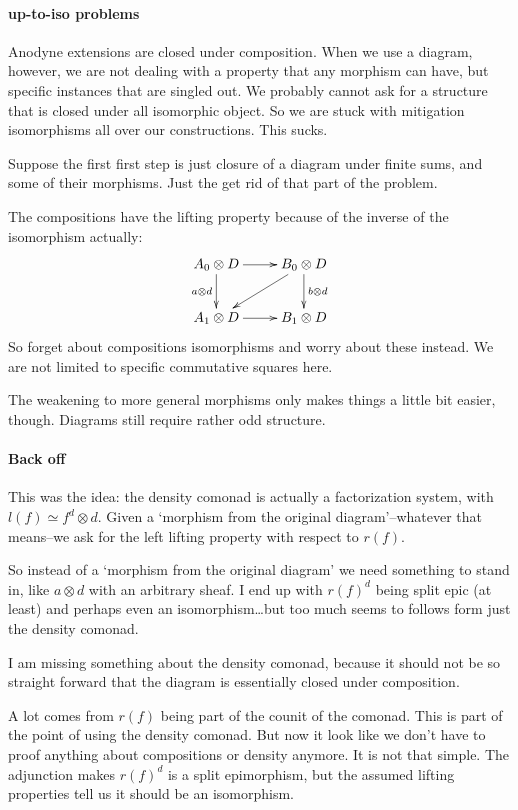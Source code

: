 \documentclass[csh.tex]{subfiles}
\begin{document}
\paragraph{up-to-iso problems}
Anodyne extensions are closed under composition. When we use a diagram, however, we are not dealing with a property that any morphism can have, but specific instances that are singled out. We probably cannot ask for a structure that is closed under all isomorphic object. So we are stuck with mitigation isomorphisms all over our constructions. This sucks.

Suppose the first first step is just closure of a diagram under finite sums, and some of their morphisms. Just the get rid of that part of the problem. 

The compositions have the lifting property because of the inverse of the
isomorphism actually:
\[\xymatrix{
A_0\otimes D\ar[d]_{a\otimes d} \ar[r] & B_0\otimes D \ar[d]^{b\otimes d}\ar[dl] \\
A_1\otimes D \ar[r] & B_1\otimes D
}\]
So forget about compositions isomorphisms and worry about these instead.
We are not limited to specific commutative squares here.

The weakening to more general morphisms only makes things a little bit easier, though. Diagrams still require rather odd structure.

\paragraph{Back off}
This was the idea: the density comonad is actually a factorization system, with $l(f) \simeq f^d\otimes d$. Given a `morphism from the original diagram'--whatever that means--we ask for the left lifting property with respect to $r(f)$.

So instead of a `morphism from the original diagram' we need something to stand in, like $a\otimes d$ with an arbitrary sheaf. I end up with $r(f)^d$ being split epic (at least) and perhaps even an isomorphism\dots but too much seems to follows form just the density comonad.

I am missing something about the density comonad, because it should not be so straight forward that the diagram is essentially closed under composition. 

A lot comes from $r(f)$ being part of the counit of the comonad. This is part of the point of using the density comonad. But now it look like we don't have to proof anything about compositions or density anymore.
It is not that simple. The adjunction makes $r(f)^d$ is a split epimorphism, but the assumed lifting properties tell us it should be an isomorphism.
\end{document}

